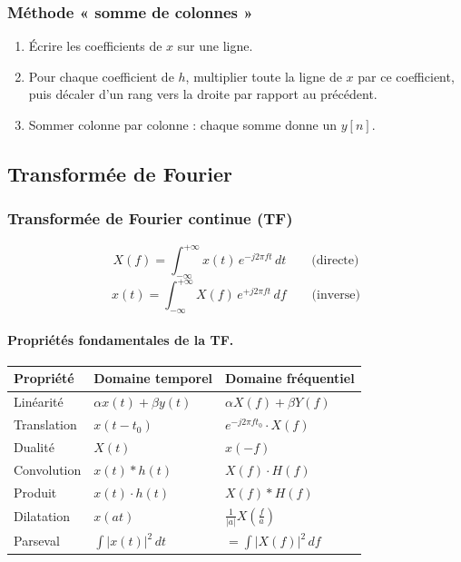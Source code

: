 \documentclass[12pt,a4paper]{article}
\begin{document}
\subsubsection{Méthode « somme de colonnes »}

\begin{tcolorbox}[methbox, title=Méthode somme de colonnes (tableau)]
\begin{enumerate}
  \item Écrire les coefficients de $x$ sur une ligne.
  \item Pour chaque coefficient de $h$, multiplier toute la ligne de $x$ par ce coefficient,
        puis décaler d'un rang vers la droite par rapport au précédent.
  \item Sommer colonne par colonne : chaque somme donne un $y[n]$.
\end{enumerate}
\end{tcolorbox}

\subsection{Transformée de Fourier}

\subsubsection{Transformée de Fourier continue (TF)}

\begin{tcolorbox}[formbox, title=TF continue]
\[
  X(f) = \int_{-\infty}^{+\infty} x(t)\,e^{-j2\pi ft}\,dt
  \qquad\text{(directe)}
\]
\[
  x(t) = \int_{-\infty}^{+\infty} X(f)\,e^{+j2\pi ft}\,df
  \qquad\text{(inverse)}
\]
\end{tcolorbox}

\paragraph{Propriétés fondamentales de la TF.}

\begin{center}
\renewcommand{\arraystretch}{1.4}
\begin{tabular}{@{}lll@{}}
\toprule
\textbf{Propriété} & \textbf{Domaine temporel} & \textbf{Domaine fréquentiel} \\
\midrule
Linéarité & $\alpha x(t) + \beta y(t)$ & $\alpha X(f) + \beta Y(f)$ \\
Translation & $x(t-t_0)$ & $e^{-j2\pi f t_0}\cdot X(f)$ \\
Dualité & $X(t)$ & $x(-f)$ \\
Convolution & $x(t) * h(t)$ & $X(f)\cdot H(f)$ \\
Produit & $x(t)\cdot h(t)$ & $X(f) * H(f)$ \\
Dilatation & $x(at)$ & $\frac{1}{|a|}X\!\left(\frac{f}{a}\right)$ \\
Parseval & $\int|x(t)|^2\,dt$ & $= \int|X(f)|^2\,df$ \\
\bottomrule
\end{tabular}
\end{center}
\end{document}
